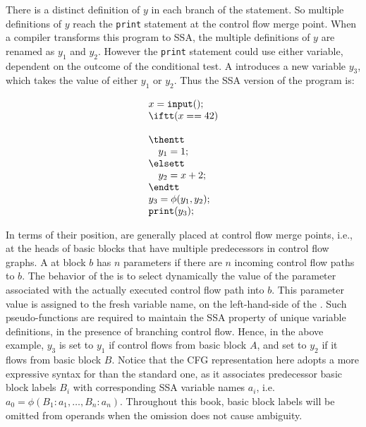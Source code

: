 There is a distinct definition of $y$ in each branch of the \iftt
statement. So multiple definitions of $y$ reach the \texttt{print} statement
at the control flow merge point. When a compiler transforms this program 
to SSA,
the multiple definitions of $y$ are renamed as $y_1$ and $y_2$. However 
the \texttt{print} statement could use either variable, dependent on the
outcome of the \iftt conditional test. A \phifun introduces
a new variable $y_3$, which takes the value of either $y_1$ or $y_2$.
Thus the SSA version of the program is:
\smallskip

\begin{minipage}{0.4\textwidth}
\begin{equation*}
\begin{array}{l}
x = \texttt{input}();\\
\iftt (x == 42)\\
\\
\thentt\\
\quad    y_1 = 1;\\
\elsett\\
\quad    y_2 = x + 2;\\
\endtt\\
y_3 = \phi(y_1,y_2);\\
\texttt{print}(y_3);\\
\end{array}
\end{equation*}
\end{minipage}
\begin{minipage}{0.4\textwidth}
\strut
\end{minipage}
\bigskip


In terms of their position, 
\phifuns{} are generally placed at control flow merge points,
i.e., at the heads of basic blocks that have multiple predecessors in
control flow graphs.
A \phifun at block $b$ has
$n$ parameters if there are $n$ incoming control flow paths to $b$.
The behavior of the \phifun is to select dynamically
the value of the parameter associated with the actually executed
control flow path into $b$.
This parameter value is assigned to the fresh variable name,
on the left-hand-side of the \phifun.
Such pseudo-functions are required to maintain the SSA property
of unique variable definitions,
in the presence of branching control flow.
Hence, in the above example, $y_3$ is set to $y_1$ if 
control flows from basic block $A$, and set to $y_2$ if it flows from
basic block $B$.
Notice that the CFG representation here adopts a more expressive syntax for
\phifuns than the standard one, as it associates predecessor basic block labels $B_i$
with corresponding SSA variable names $a_i$, i.e.\
$a_0 = \phi(B_1:a_1, \ldots, B_n:a_n)$.
Throughout this book, basic block labels will be omitted from \phifun
operands when the omission does not cause ambiguity.

